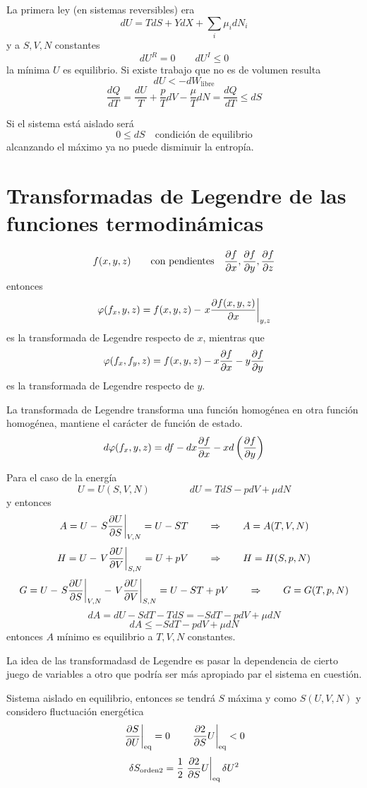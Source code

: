 \documentclass[10pt,oneside]{CBFT_book}
\begin{document}
La primera ley (en sistemas reversibles) era 
\[
	dU = TdS + YdX + \sum_i \mu_i dN_i
\]
y a $S,V,N$ constantes 
\[
	dU^R = 0 \qquad dU^I \leq 0
\]
la mínima $U$ es equilibrio.
Si existe trabajo que no es de volumen resulta 
\[
	dU < -dW_\text{libre}
\]
\[
	\frac{dQ}{dT} = \frac{dU}{T} + \frac{p}{T}dV - \frac{\mu}{T}dN = \frac{dQ}{dT} \leq dS
\]

Si el sistema está aislado será
\[
	0 \leq dS \quad \text{condición de equilibrio}
\]
alcanzando el máximo ya no puede disminuir la entropía.


\section{Transformadas de Legendre de las funciones termodinámicas}

\[
	f(x,y,z) \qquad \text{con pendientes} \quad \frac{\partial^{\hspace{-0.05em}} {f}}{\partial {x}^{\hspace{-0.05em}}},\frac{\partial^{\hspace{-0.05em}} {f}}{\partial {y}^{\hspace{-0.05em}}},\frac{\partial^{\hspace{-0.05em}} {f}}{\partial {z}^{\hspace{-0.05em}}}
\]
entonces 
\[
	\varphi(f_x,y,z) = f(x,y,z) - \left. x \frac{\partial^{\hspace{-0.05em}} {f(x,y,z)}}{\partial {x}^{\hspace{-0.05em}}}\right|_{y,z}
\]
es la transformada de Legendre respecto de $x$, mientras que 
\[
	\varphi(f_x,f_y,z) = f(x,y,z) - x \frac{\partial^{\hspace{-0.05em}} {f}}{\partial {x}^{\hspace{-0.05em}}} - y \frac{\partial^{\hspace{-0.05em}} {f}}{\partial {y}^{\hspace{-0.05em}}}
\]
es la transformada de Legendre respecto de $y$.

La transformada de Legendre transforma una función homogénea en otra función homogénea, mantiene el
carácter de función de estado.
\[
	d\varphi(f_x,y,z) = df - dx \frac{\partial^{\hspace{-0.05em}} {f}}{\partial {x}^{\hspace{-0.05em}}} - x d\left( \frac{\partial^{\hspace{-0.05em}} {f}}{\partial {y}^{\hspace{-0.05em}}} \right)
\]

Para el caso de la energía
\[
	U=U(S,V,N) \qquad \qquad dU = TdS - pdV + \mu dN
\]
y entonces
\[
	A = U - \left. S\frac{\partial^{\hspace{-0.05em}} {U}}{\partial {S}^{\hspace{-0.05em}}}\right|_{V,N} = U - ST \qquad \Rightarrow \qquad  A=A(T,V,N)
\]
\[
	H = U - \left. V\frac{\partial^{\hspace{-0.05em}} {U}}{\partial {V}^{\hspace{-0.05em}}}\right|_{S,N} = U + pV \qquad \Rightarrow \qquad  H=H(S,p,N)
\]
\[
	G = U - \left. S\frac{\partial^{\hspace{-0.05em}} {U}}{\partial {S}^{\hspace{-0.05em}}}\right|_{V,N} - \left. V\frac{\partial^{\hspace{-0.05em}} {U}}{\partial {V}^{\hspace{-0.05em}}}\right|_{S,N} = 
	U - ST + pV \qquad \Rightarrow \qquad  G=G(T,p,N)
\]
\[
	dA = dU - SdT - TdS = -SdT - pdV + \mu dN
\]
\[
	dA \leq -SdT - pdV + \mu dN 
\]
entonces $A$ mínimo es equilibrio a $T,V,N$ constantes.

La idea de las transformadasd de Legendre es pasar la dependencia de cierto juego de variables a otro
que podría ser más apropiado par el sistema en cuestión.

Sistema aislado en equilibrio, entonces se tendrá $S$ máxima y como $S(U,V,N)$ y considero fluctuación
energética
\[
	\left. \frac{\partial^{\hspace{-0.05em}} {S}}{\partial {U}^{\hspace{-0.05em}}} \right|_{\text{eq}} = 0 \qquad \left. \frac{\partial^{\hspace{-0.05em}} {2}}{\partial {S}^{\hspace{-0.05em}}}{U} \right|_{\text{eq}} < 0
\]
\[
	\delta S_{\mathrm{orden 2}} = \frac{1}{2} \left. \frac{\partial^{\hspace{-0.05em}} {2}}{\partial {S}^{\hspace{-0.05em}}}{U} \right|_{\text{eq}} \delta U^2
\]
\end{document}

